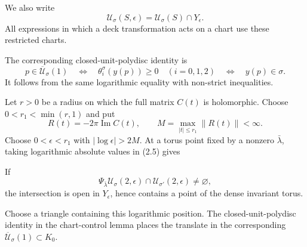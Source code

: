 
We also write
\[
 \mathcal U_\sigma(S,\epsilon)
 =\mathcal U_\sigma(S)\cap Y_\epsilon.
\]
All expressions in which a deck transformation acts on a chart use these
restricted charts.

The corresponding closed-unit-polydisc identity is
\[
 p\in\overline{\mathcal U}_\sigma(1)
 \quad\Longleftrightarrow\quad
 \theta_i^\sigma(y(p))\ge0\quad(i=0,1,2)
 \quad\Longleftrightarrow\quad y(p)\in\sigma.
\]
It follows from the same logarithmic equality with non-strict inequalities.

Let \(r>0\) be a radius on which the full matrix \(C(t)\) is holomorphic.
Choose \(0<r_1<\min(r,1)\) and put
\[
 R(t)=-2\pi\operatorname{Im}C(t),\qquad
 M=\max_{|t|\le r_1}\|R(t)\|<\infty.
\]
Choose \(0<\epsilon<r_1\) with \(|\log\epsilon|>2M\).
At a torus point fixed by a nonzero \(\bar\lambda\), taking logarithmic
absolute values in (2.5) gives

If
\[
 \Psi_{\bar\lambda}\mathcal U_\sigma(2,\epsilon)
 \cap\mathcal U_{\sigma'}(2,\epsilon)\ne\varnothing,
\]
the intersection is open in \(Y_\epsilon\), hence contains a point of the
dense invariant torus.

Choose a triangle containing this logarithmic position.  The
closed-unit-polydisc identity in the chart-control lemma places the translate
in the corresponding \(\overline{\mathcal U}_\sigma(1)\subset K_0\).

